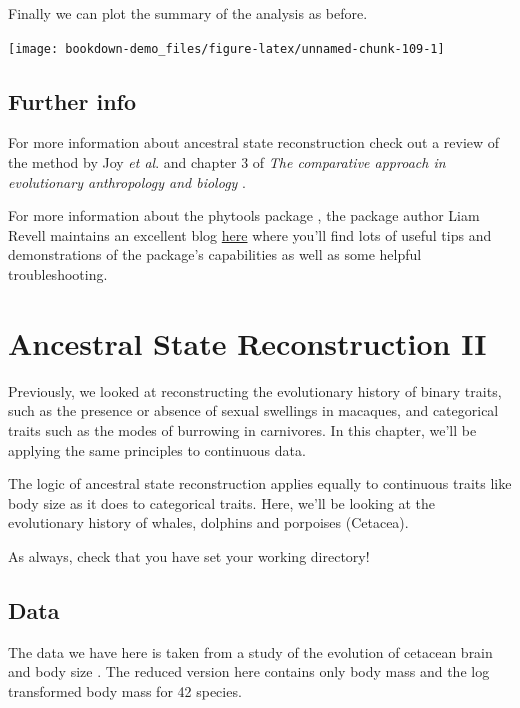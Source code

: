 \documentclass[
]{book}
\begin{document}
Finally we can plot the summary of the analysis as before.

\begin{center}\texttt{[image: bookdown-demo\_files/figure-latex/unnamed-chunk-109-1]} \end{center}

\hypertarget{further-info-3}{%
\section{Further info}\label{further-info-3}}

For more information about ancestral state reconstruction check out a review of the method by Joy \emph{et al}. \citep{Joy16} and chapter 3 of \emph{The comparative approach in evolutionary anthropology and biology} \citep{Nunn11}.

For more information about the phytools package \citep{phytools}, the package author Liam Revell maintains an excellent blog \href{http://blog.phytools.org/}{here} where you'll find lots of useful tips and demonstrations of the package's capabilities as well as some helpful troubleshooting.

\hypertarget{asr2}{%
\chapter{Ancestral State Reconstruction II}\label{asr2}}

Previously, we looked at reconstructing the evolutionary history of binary traits, such as the presence or absence of sexual swellings in macaques, and categorical traits such as the modes of burrowing in carnivores. In this chapter, we'll be applying the same principles to continuous data.

The logic of ancestral state reconstruction applies equally to continuous traits like body size as it does to categorical traits. Here, we'll be looking at the evolutionary history of whales, dolphins and porpoises (Cetacea).

As always, check that you have set your working directory!

\hypertarget{data-3}{%
\section{Data}\label{data-3}}

The data we have here is taken from a study of the evolution of cetacean brain and body size \citep{Montgomery13}. The reduced version here contains only body mass and the log transformed body mass for 42 species.
\end{document}
